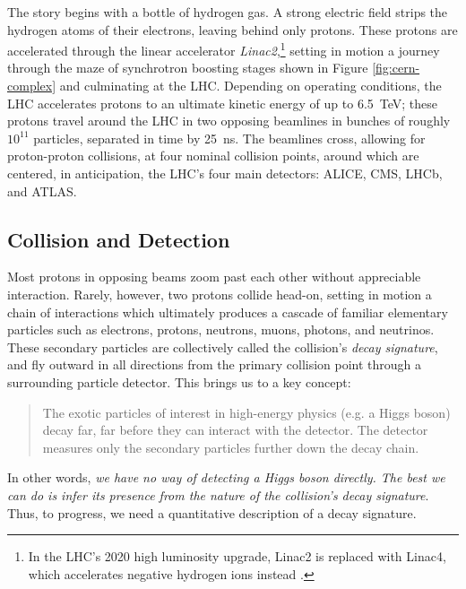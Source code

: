 \documentclass[11pt, a4paper]{article}
\begin{document}
The story begins with a bottle of hydrogen gas. A strong electric field strips the hydrogen atoms of their electrons, leaving behind only protons. These protons are accelerated through the linear accelerator \textit{Linac2},\footnote{In the LHC's 2020 high luminosity upgrade, Linac2 is replaced with Linac4, which accelerates negative hydrogen ions instead \cite{linac4-tdr}.} setting in motion a journey through the maze of synchrotron boosting stages shown in Figure \ref{fig:cern-complex} and culminating at the LHC. Depending on operating conditions, the LHC accelerates protons to an ultimate kinetic energy of up to \SI{6.5}{\tera \electronvolt}; these protons travel around the LHC in two opposing beamlines in bunches of roughly $ 10^{11} $ particles, separated in time by \SI{25}{\nano \second}. The beamlines cross, allowing for proton-proton collisions, at four nominal collision points, around which are centered, in anticipation, the LHC's four main detectors: ALICE, CMS, LHCb, and ATLAS.

\subsection{Collision and Detection}
Most protons in opposing beams zoom past each other without appreciable interaction. Rarely, however, two protons collide head-on, setting in motion a chain of interactions which ultimately produces a cascade of familiar elementary particles such as electrons, protons, neutrons, muons, photons, and neutrinos. These secondary particles are collectively called the collision's \textit{decay signature}, and fly outward in all directions from the primary collision point through a surrounding particle detector. This brings us to a key concept:
\begin{quote}
    The exotic particles of interest in high-energy physics (e.g. a Higgs boson) decay far, far before they can interact with the detector. The detector measures only the secondary particles further down the decay chain.
\end{quote}
In other words, \textit{we have no way of detecting a Higgs boson directly. The best we can do is infer its presence from the nature of the collision's decay signature}. Thus, to progress, we need a quantitative description of a decay signature.
\end{document}
